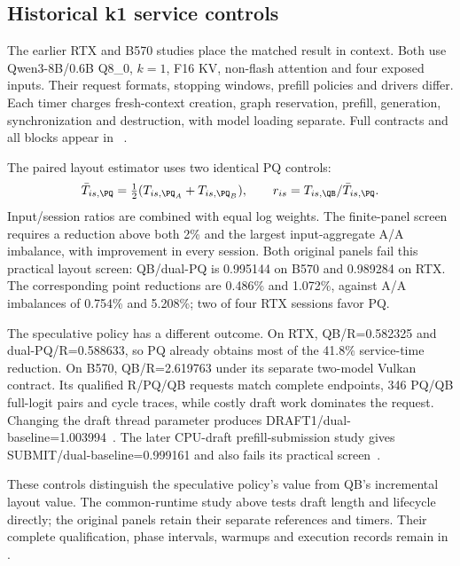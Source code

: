 \subsection{Historical k1 service controls}
\label{sec:service}
The earlier RTX and B570 studies place the matched result in context. Both use Qwen3-8B/0.6B Q8\_0, $k=1$, F16 KV, non-flash attention and four exposed inputs. Their request formats, stopping windows, prefill policies and drivers differ. Each timer charges fresh-context creation, graph reservation, prefill, generation, synchronization and destruction, with model loading separate. Full contracts and all blocks appear in ~\cite{b570servicerecords,rtxservicerecords}.

The paired layout estimator uses two identical PQ controls:
\begin{equation}
\bar T_{is,\PQ}=\tfrac12(T_{is,\PQ_A}+T_{is,\PQ_B}),\qquad
r_{is}=T_{is,\QB}/\bar T_{is,\PQ}.
\label{eq:servicepair}
\end{equation}
Input/session ratios are combined with equal log weights. The finite-panel screen requires a reduction above both 2\% and the largest input-aggregate A/A imbalance, with improvement in every session. Both original panels fail this practical layout screen: QB/dual-PQ is 0.995144 on B570 and 0.989284 on RTX. The corresponding point reductions are 0.486\% and 1.072\%, against A/A imbalances of 0.754\% and 5.208\%; two of four RTX sessions favor PQ.

The speculative policy has a different outcome. On RTX, QB/R=0.582325 and dual-PQ/R=0.588633, so PQ already obtains most of the 41.8\% service-time reduction. On B570, QB/R=2.619763 under its separate two-model Vulkan contract. Its qualified R/PQ/QB requests match complete endpoints, 346 PQ/QB full-logit pairs and cycle traces, while costly draft work dominates the request. Changing the draft thread parameter produces DRAFT1/dual-baseline=1.003994~\cite{b570policyrecords}. The later CPU-draft prefill-submission study gives SUBMIT/dual-baseline=0.999161 and also fails its practical screen~\cite{b570prefillrecords}.

These controls distinguish the speculative policy's value from QB's incremental layout value. The common-runtime study above tests draft length and lifecycle directly; the original panels retain their separate references and timers. Their complete qualification, phase intervals, warmups and execution records remain in .
